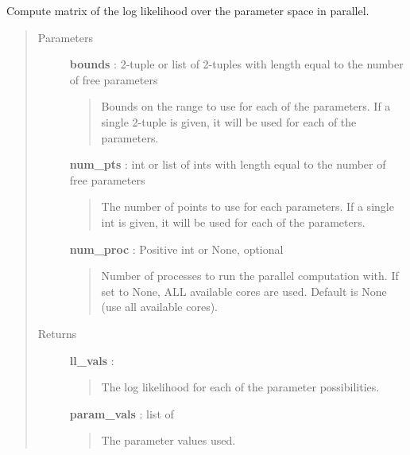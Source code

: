 \documentclass[letterpaper,10pt,english]{sphinxmanual}
\begin{document}
\begin{fulllineitems}
\label{gptools:gptools.utils.parallel_compute_ll_matrix}
Compute matrix of the log likelihood over the parameter space in parallel.
\begin{quote}\begin{description}
\item[{Parameters }] \leavevmode
\textbf{bounds} : 2-tuple or list of 2-tuples with length equal to the number of free parameters
\begin{quote}

Bounds on the range to use for each of the parameters. If a single
2-tuple is given, it will be used for each of the parameters.
\end{quote}

\textbf{num\_pts} : int or list of ints with length equal to the number of free parameters
\begin{quote}

The number of points to use for each parameters. If a single int is
given, it will be used for each of the parameters.
\end{quote}

\textbf{num\_proc} : Positive int or None, optional
\begin{quote}

Number of processes to run the parallel computation with. If set to
None, ALL available cores are used. Default is None (use all available
cores).
\end{quote}

\item[{Returns }] \leavevmode
\textbf{ll\_vals} : 
\begin{quote}

The log likelihood for each of the parameter possibilities.
\end{quote}

\textbf{param\_vals} : list of 
\begin{quote}

The parameter values used.
\end{quote}

\end{description}\end{quote}

\end{fulllineitems}
\end{document}
